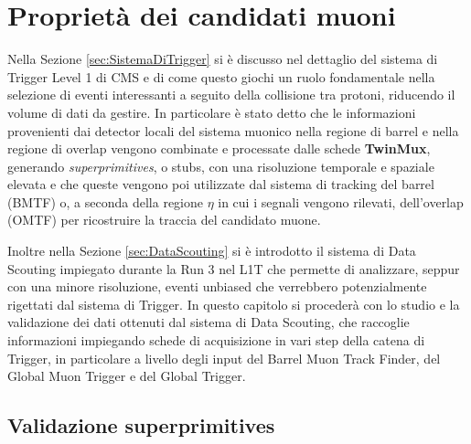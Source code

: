 \chapter{Proprietà dei candidati muoni}
\label{cap:SecondoCapitolo}

Nella Sezione \ref{sec:SistemaDiTrigger} si è discusso nel dettaglio del sistema di Trigger Level 1 di CMS e di come questo giochi un ruolo fondamentale nella selezione di eventi interessanti a seguito della collisione tra protoni, riducendo il volume di dati da gestire. In particolare è stato detto che le informazioni provenienti dai detector locali del sistema muonico nella regione di barrel e nella regione di overlap vengono combinate e processate dalle schede \textbf{TwinMux}, generando \textit{superprimitives}, o stubs, con una risoluzione temporale e spaziale elevata e che queste vengono poi utilizzate dal sistema di tracking del barrel (BMTF) o, a seconda della regione $\eta$ in cui i segnali vengono rilevati, dell'overlap (OMTF) per ricostruire la traccia del candidato muone.

Inoltre nella Sezione \ref{sec:DataScouting} si è introdotto il sistema di Data Scouting impiegato durante la Run 3 nel L1T che permette di analizzare, seppur con una minore risoluzione, eventi unbiased che verrebbero potenzialmente rigettati dal sistema di Trigger. In questo capitolo si procederà con lo studio e la validazione dei dati ottenuti dal sistema di Data Scouting, che raccoglie informazioni impiegando schede di acquisizione in vari step della catena di Trigger, in particolare a livello degli input del Barrel Muon Track Finder, del Global Muon Trigger e del Global Trigger.


\section{Validazione superprimitives}
\label{sec:Superprimitives}

